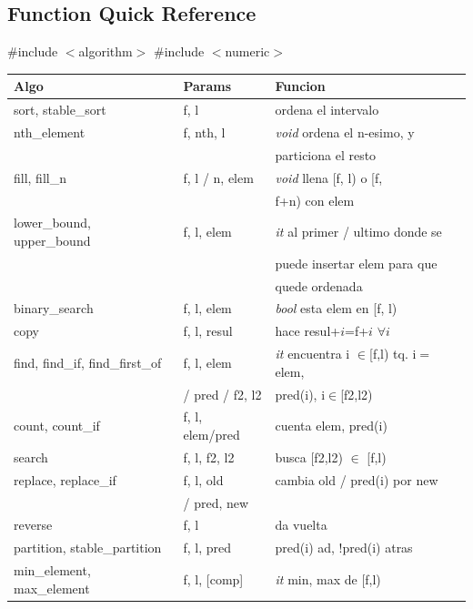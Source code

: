 \subsection{Function Quick Reference}
\begingroup
\small
\#include $<$algorithm$>$ \#include $<$numeric$>$ \\
\begin{tabular}{|l|l|p{5.4cm}|} \hline
	\textbf{Algo} & \textbf{Params} &  \textbf{Funcion} \\  \hline
	sort, stable\_sort & f, l &  ordena el intervalo \\  \hline
	nth\_element & f, nth, l & \textit{void} ordena el n-esimo, y \\ && particiona el resto \\  \hline
	fill, fill\_n & f, l / n, elem & \textit{void} llena [f, l) o [f, \\ && f+n) con elem \\  \hline
	lower\_bound, upper\_bound & f, l, elem & \textit{it} al primer / ultimo donde se \\ && puede insertar elem para que\\ && quede ordenada \\  \hline
	binary\_search & f, l, elem & \textit{bool} esta elem en [f, l) \\  \hline
	copy & f, l, resul & hace resul+$i$=f+$i$ $\forall i$ \\  \hline
	find, find\_if, find\_first\_of & f, l, elem & \textit{it} encuentra i $\in$[f,l) tq. i$=$elem, \\ & / pred / f2, l2 & pred(i), i$\in$[f2,l2)\\\hline
	count, count\_if & f, l, elem/pred & cuenta elem, pred(i)\\\hline
	search & f, l, f2, l2 & busca [f2,l2) $\in$ [f,l)\\\hline
	replace, replace\_if & f, l, old & cambia old / pred(i) por new \\ & / pred, new &\\\hline
	reverse & f, l & da vuelta\\\hline
	partition, stable\_partition & f, l, pred & pred(i) ad, !pred(i) atras\\\hline
	min\_element, max\_element & f, l, [comp] & \textit{it} min, max de [f,l)\\\hline

\end{tabular}
